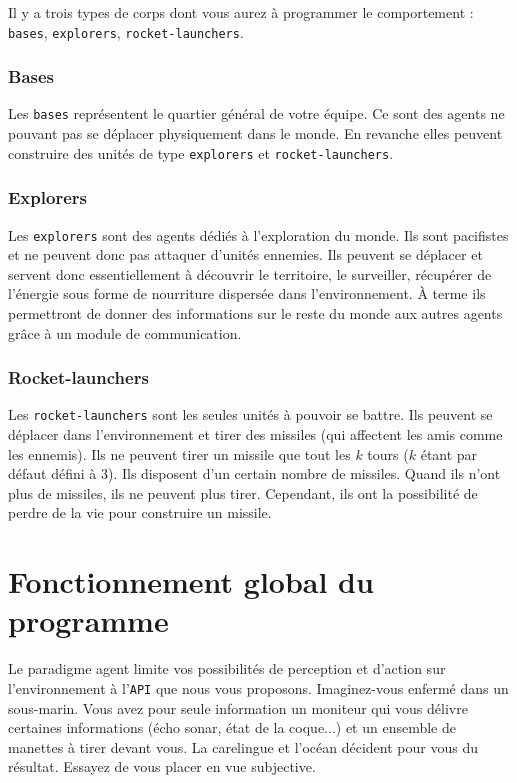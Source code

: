 \documentclass[a4paper,11pt]{article}
\begin{document}
Il y a trois types de corps dont vous aurez à programmer le comportement : \texttt{bases},
\texttt{explorers}, \texttt{rocket-launchers}.

\subsubsection*{Bases}
Les \texttt{bases} représentent le quartier général de votre équipe. Ce sont des agents ne pouvant
pas se déplacer physiquement dans le monde. En revanche elles peuvent construire des unités de type
\texttt{explorers} et \texttt{rocket-launchers}.

\subsubsection*{Explorers}
Les \texttt{explorers} sont des agents dédiés à l'exploration du monde. Ils sont pacifistes et ne
peuvent donc pas attaquer d'unités ennemies. Ils peuvent se déplacer et servent donc essentiellement
à découvrir le territoire, le surveiller, récupérer de l'énergie sous forme de nourriture dispersée
dans l'environnement. À terme ils permettront de donner des informations sur le reste du monde aux
autres agents grâce à un module de communication.

\subsubsection*{Rocket-launchers}
Les \texttt{rocket-launchers} sont les seules unités à pouvoir se battre. Ils peuvent se déplacer
dans l'environnement et tirer des missiles (qui affectent les amis comme les ennemis). Ils ne
peuvent tirer un missile que tout les $k$ tours ($k$ étant par défaut défini à 3). Ils disposent
d'un certain nombre de missiles. Quand ils n'ont plus de missiles, ils ne peuvent plus tirer.
Cependant, ils ont la possibilité de perdre de la vie pour construire un missile.



\section*{Fonctionnement global du programme}

Le paradigme agent limite vos possibilités de perception et d'action sur l'environnement à
l'\texttt{API} que nous vous proposons. Imaginez-vous enfermé dans un sous-marin. Vous avez pour
seule information un moniteur qui vous délivre certaines informations (écho sonar, état de la
coque...) et un ensemble de manettes à tirer devant vous. La carelingue et l'océan décident pour
vous du résultat. Essayez de vous placer en vue subjective.\\
\end{document}
